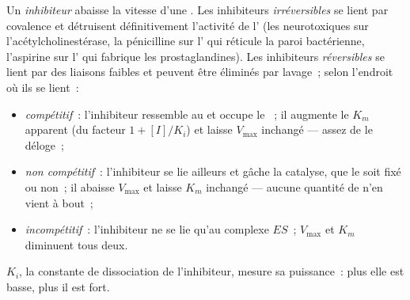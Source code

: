 \begin{definition}[Inhibiteurs]\label{def:b1:enzymes:inhibitors}
Un \emph{inhibiteur} abaisse la vitesse
d'une . Les inhibiteurs \emph{irréversibles} se lient par covalence
et détruisent définitivement l'activité de l' (les neurotoxiques
sur l'acétylcholinestérase, la pénicilline sur l' qui réticule la
paroi bactérienne, l'aspirine sur l' qui fabrique les
prostaglandines). Les inhibiteurs \emph{réversibles} se lient par des
liaisons faibles et peuvent être éliminés par lavage~; selon l'endroit
où ils se lient~:
\begin{itemize}
  \item \emph{compétitif}~: l'inhibiteur
        ressemble au  et occupe le ~; il augmente le
        $K_m$ apparent (du facteur $1 + [I]/K_i$) et laisse $V_{\max}$
        inchangé --- assez de  le déloge~;
  \item \emph{non compétitif}~: l'inhibiteur se lie ailleurs et gâche la
        catalyse, que le  soit fixé ou non~; il abaisse
        $V_{\max}$ et laisse $K_m$ inchangé --- aucune quantité de
         n'en vient à bout~;
  \item \emph{incompétitif}~: l'inhibiteur ne se lie qu'au complexe
        $ES$~; $V_{\max}$ et $K_m$ diminuent tous deux.
\end{itemize}
$K_i$, la constante de dissociation de l'inhibiteur, mesure sa
puissance~: plus elle est basse, plus il est fort.
\end{definition}

